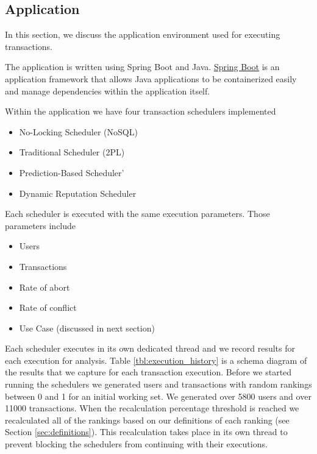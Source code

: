 \subsection{Application}
\label{sec:er_application}

In this section, we discuss the application environment used for executing transactions.

The application is written using Spring Boot and Java.
\href{https://spring.io/projects/spring-boot}{Spring Boot} is an application framework that allows Java applications to be containerized easily and manage dependencies within the application itself.

Within the application we have four transaction schedulers implemented

\begin{itemize}
  \item No-Locking Scheduler (NoSQL)
  \item Traditional Scheduler (\ac{2PL})
  \item Prediction-Based Scheduler'
  \item Dynamic Reputation Scheduler
\end{itemize}

Each scheduler is executed with the same execution parameters. Those parameters include

\begin{itemize}
    \item Users
    \item Transactions
    \item Rate of abort
    \item Rate of conflict
    \item Use Case (discussed in next section)
\end{itemize}

Each scheduler executes in its own dedicated thread and we record results for each execution for analysis. Table \ref{tbl:execution_history} is a schema diagram of the results that we capture for each transaction execution. Before we started running the schedulers we generated users and transactions with random rankings between 0 and 1 for an initial working set. We generated over 5800 users and over 11000 transactions.  When the recalculation percentage threshold is reached we recalculated all of the rankings based on our definitions of each ranking (see Section \ref{sec:definitions}). This recalculation takes place in its own thread to prevent blocking the schedulers from continuing with their executions.

